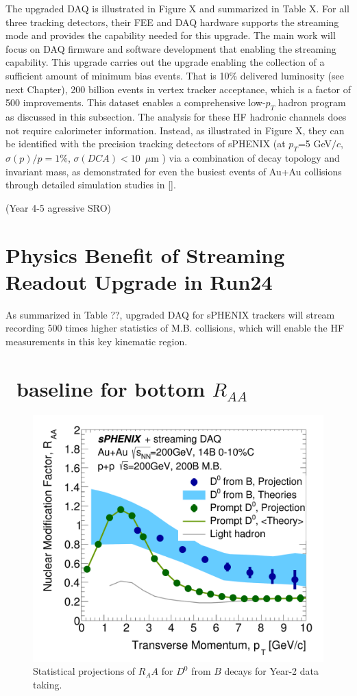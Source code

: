  The upgraded DAQ is illustrated in Figure X and summarized in Table X. For all three tracking detectors, their FEE and DAQ hardware supports the streaming mode and provides the capability needed for this upgrade. The main work will focus on DAQ firmware and software development that enabling the streaming capability. 
This upgrade carries out the upgrade enabling the collection of a sufficient amount of minimum bias \pp events. That is 10\% delivered luminosity (see next Chapter), 200 billion events in vertex tracker acceptance, which is a factor of 500 improvements. This dataset enables a comprehensive low-$p_T$ hadron program as discussed in this subsection. The analysis for these HF hadronic channels does not require calorimeter information. Instead, as illustrated in Figure X, they can be identified with the precision tracking detectors of sPHENIX (at $p_T$=5 GeV$/c$, $\sigma(p)/p=1\%$, $\sigma(DCA)<10$~$\mu$m ) via a combination of decay topology and invariant mass, as demonstrated for even the busiest events of Au+Au collisions through detailed simulation studies in []. 
 
(Year 4-5 agressive SRO)

\section{Physics Benefit of Streaming Readout Upgrade in Run24}
 
 As summarized in Table ??, upgraded DAQ for sPHENIX trackers will stream recording 500 times higher statistics of M.B. \pp collisions, which will enable the HF measurements in this key kinematic region.


\section{\pp~baseline for bottom $R_{AA}$}


\begin{figure}[htbp]
\begin{center}
\includegraphics[width=.49\linewidth]{figs/RAA_DB_theory_root_RAADB_pp200B.pdf}
\caption{Statistical projections of $R_AA$ for $D^0$ from $B$ decays for Year-2 data taking.}
\label{fig:RAA-D0}
\end{center}
\end{figure}



